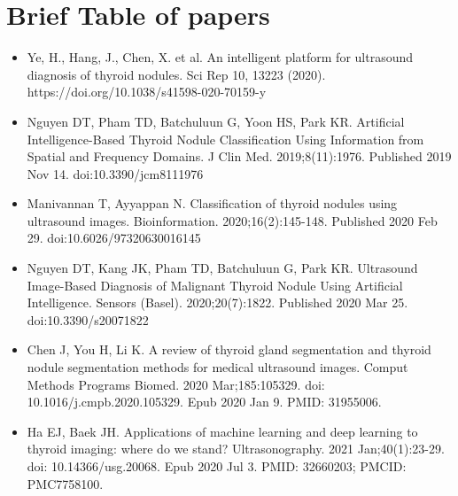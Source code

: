 	\section{Brief Table of papers}
	\begin{itemize}
		\item Ye, H., Hang, J., Chen, X. et al. An intelligent platform for ultrasound diagnosis of thyroid nodules. Sci Rep 10, 13223 (2020). https://doi.org/10.1038/s41598-020-70159-y
		\item Nguyen DT, Pham TD, Batchuluun G, Yoon HS, Park KR. Artificial Intelligence-Based Thyroid Nodule Classification Using Information from Spatial and Frequency Domains. J Clin Med. 2019;8(11):1976. Published 2019 Nov 14. doi:10.3390/jcm8111976
		\item Manivannan T, Ayyappan N. Classification of thyroid nodules using ultrasound images. Bioinformation. 2020;16(2):145-148. Published 2020 Feb 29. doi:10.6026/97320630016145
		\item Nguyen DT, Kang JK, Pham TD, Batchuluun G, Park KR. Ultrasound Image-Based Diagnosis of Malignant Thyroid Nodule Using Artificial Intelligence. Sensors (Basel). 2020;20(7):1822. Published 2020 Mar 25. doi:10.3390/s20071822
		\item Chen J, You H, Li K. A review of thyroid gland segmentation and thyroid nodule segmentation methods for medical ultrasound images. Comput Methods Programs Biomed. 2020 Mar;185:105329. doi: 10.1016/j.cmpb.2020.105329. Epub 2020 Jan 9. PMID: 31955006.
		\item Ha EJ, Baek JH. Applications of machine learning and deep learning to thyroid imaging: where do we stand? Ultrasonography. 2021 Jan;40(1):23-29. doi: 10.14366/usg.20068. Epub 2020 Jul 3. PMID: 32660203; PMCID: PMC7758100.
	\end{itemize}
